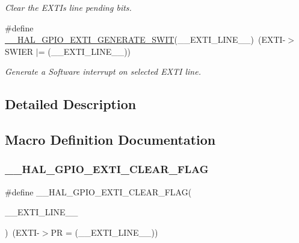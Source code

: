 \begin{DoxyCompactItemize}
\begin{DoxyCompactList}\small\item\em Clear the E\+X\+TI\textquotesingle{}s line pending bits. \end{DoxyCompactList}\item 
\#define \hyperlink{group___g_p_i_o___exported___macros_gac50aef6881e1f76032941ead9c9bce61}{\+\_\+\+\_\+\+H\+A\+L\+\_\+\+G\+P\+I\+O\+\_\+\+E\+X\+T\+I\+\_\+\+G\+E\+N\+E\+R\+A\+T\+E\+\_\+\+S\+W\+IT}(\+\_\+\+\_\+\+E\+X\+T\+I\+\_\+\+L\+I\+N\+E\+\_\+\+\_\+)~(E\+X\+TI-\/$>$S\+W\+I\+ER $\vert$= (\+\_\+\+\_\+\+E\+X\+T\+I\+\_\+\+L\+I\+N\+E\+\_\+\+\_\+))
\begin{DoxyCompactList}\small\item\em Generate a Software interrupt on selected E\+X\+TI line. \end{DoxyCompactList}\end{DoxyCompactItemize}


\subsection{Detailed Description}


\subsection{Macro Definition Documentation}
\mbox{\label{group___g_p_i_o___exported___macros_ga2f28fc349d1812cdc55a77c68d2b278d}} 
\subsubsection{\texorpdfstring{\+\_\+\+\_\+\+H\+A\+L\+\_\+\+G\+P\+I\+O\+\_\+\+E\+X\+T\+I\+\_\+\+C\+L\+E\+A\+R\+\_\+\+F\+L\+AG}{\_\_HAL\_GPIO\_EXTI\_CLEAR\_FLAG}}
{\footnotesize\ttfamily \#define \+\_\+\+\_\+\+H\+A\+L\+\_\+\+G\+P\+I\+O\+\_\+\+E\+X\+T\+I\+\_\+\+C\+L\+E\+A\+R\+\_\+\+F\+L\+AG(\begin{DoxyParamCaption}\item[{}]{\+\_\+\+\_\+\+E\+X\+T\+I\+\_\+\+L\+I\+N\+E\+\_\+\+\_\+ }\end{DoxyParamCaption})~(E\+X\+TI-\/$>$PR = (\+\_\+\+\_\+\+E\+X\+T\+I\+\_\+\+L\+I\+N\+E\+\_\+\+\_\+))}



